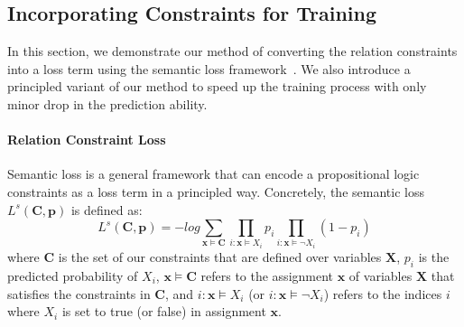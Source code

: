 \subsection{Incorporating  Constraints for Training}
\label{sec:loss_term}
In this section, we demonstrate our method of converting the relation constraints into a loss term using the semantic loss framework~\cite{xu2017semantic}.
We also introduce a principled variant of our method to speed up the training process with only minor drop in the prediction ability.

\paragraph{Relation Constraint Loss}
Semantic loss is a general framework that can encode a propositional logic constraints as a loss term in a principled way.
Concretely, the semantic loss $L^{s}(\bm{C}, \bm{p})$ is defined as:
\begin{equation}
\label{seq:semantic_loss}
	L^{s}(\bm{C}, \bm{p}) = -log\sum\limits_{\bm x\models\bm{C}}\prod\limits_{i:\bm x\models X_i}p_i\prod\limits_{i:\bm x\models \neg X_i}(1-p_i)
\end{equation}
where $\bm{C}$ is the set of our constraints that are defined over variables $\bm{X}$,
$p_i$ is the predicted probability of $X_i$,
$\bm x \models \bm{C}$ refers to the assignment $\bm x$ of variables $\bm X$ that satisfies the constraints in $\bm{C}$,
and $i:\bm x \models X_i$ (or $i:\bm x\models \neg X_i$) refers to the indices $i$ where $X_i$ is set to true (or false) in assignment $\bm x$.

